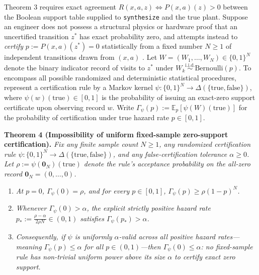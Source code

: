 \documentclass[11pt,a4paper]{article}
\providecommand{\tightlist}{\setlength{\itemsep}{2pt}\setlength{\parskip}{0pt}}
\begin{document}
Theorem 3 requires exact agreement \(R(x,a,z) \iff P(x,a)(z) > 0\)
between the Boolean support table supplied to \texttt{synthesize} and
the true plant. Suppose an engineer does not possess a structural
physics or hardware proof that an uncertified transition \(z^*\) has
exact probability zero, and attempts instead to \emph{certify}
\(p := P(x,a)(z^*) = 0\) statistically from a fixed number \(N \ge 1\)
of independent transitions drawn from \((x,a)\)
\citep{leCam1973, tsybakov2009, mayo2018}. Let
\(W = (W_1, \dots, W_N) \in \{0,1\}^N\) denote the binary indicator
record of visits to \(z^*\) under
\(W_k \stackrel{\mathrm{i.i.d.}}{\sim} \mathrm{Bernoulli}(p)\). To
encompass all possible randomized and deterministic statistical
procedures, represent a certification rule by a Markov kernel
\(\psi: \{0,1\}^N \to \Delta(\{\mathrm{true}, \mathrm{false}\})\), where
\(\psi(w)(\mathrm{true}) \in [0,1]\) is the probability of issuing an
exact-zero support certificate upon observing record \(w\). Write
\(\Gamma_\psi(p) := \mathbb{E}_p[\psi(W)(\mathrm{true})]\) for the
probability of certification under true hazard rate \(p \in [0,1]\).

\textbf{Theorem 4 (Impossibility of uniform fixed-sample zero-support
certification).} \emph{Fix any finite sample count \(N \ge 1\), any
randomized certification rule
\(\psi: \{0,1\}^N \to \Delta(\{\mathrm{true}, \mathrm{false}\})\), and
any false-certification tolerance \(\alpha \ge 0\). Let
\(\rho := \psi(\mathbf{0}_N)(\mathrm{true})\) denote the rule's
acceptance probability on the all-zero record
\(\mathbf{0}_N = (0, \dots, 0)\).}

\begin{enumerate}
\def\labelenumi{\arabic{enumi}.}
\tightlist
\item
  \emph{At \(p = 0\), \(\Gamma_\psi(0) = \rho\), and for every
  \(p \in [0,1]\), \(\Gamma_\psi(p) \ge \rho (1 - p)^N\).}
\item
  \emph{Whenever \(\Gamma_\psi(0) > \alpha\), the explicit strictly
  positive hazard rate
  \(p_* := \frac{\rho - \alpha}{2 \rho N} \in (0, 1)\) satisfies
  \(\Gamma_\psi(p_*) > \alpha\).}
\item
  \emph{Consequently, if \(\psi\) is uniformly \(\alpha\)-valid across
  all positive hazard rates---meaning \(\Gamma_\psi(p) \le \alpha\) for
  all \(p \in (0, 1)\)---then \(\Gamma_\psi(0) \le \alpha\): no
  fixed-sample rule has non-trivial uniform power above its size
  \(\alpha\) to certify exact zero support.}
\end{enumerate}
\end{document}
